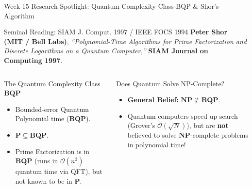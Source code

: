 \documentclass[aspectratio=169,10pt]{beamer}
\begin{document}
\begin{frame}{Week 15 Research Spotlight: Quantum Complexity Class BQP \& Shor's Algorithm}
    \begin{exampleblock}{Seminal Reading: SIAM J. Comput. 1997 / IEEE FOCS 1994}
        \textbf{Peter Shor (MIT / Bell Labs)}, \textit{``Polynomial-Time Algorithms for Prime Factorization and Discrete Logarithms on a Quantum Computer,''} \textbf{SIAM Journal on Computing 1997}.
    \end{exampleblock}
    
    \begin{columns}[T]
        \begin{block}{The Quantum Complexity Class $\mathbf{BQP}$}
            \begin{itemize}
                \item Bounded-error Quantum Polynomial time ($\mathbf{BQP}$).
                \item $\mathbf{P} \subseteq \mathbf{BQP}$.
                \item Prime Factorization is in $\mathbf{BQP}$ (runs in $\mathcal{O}(n^3)$ quantum time via QFT), but not known to be in $\mathbf{P}$.
            \end{itemize}
        \end{block}
        
        \begin{alertblock}{Does Quantum Solve NP-Complete?}
            \begin{itemize}
                \item \textbf{General Belief:} $\mathbf{NP} \not\subseteq \mathbf{BQP}$.
                \item Quantum computers speed up search (Grover's $\mathcal{O}(\sqrt{N})$), but are \textbf{not} believed to solve $\mathbf{NP}$-complete problems in polynomial time!
            \end{itemize}
        \end{alertblock}
    \end{columns}
\end{frame}
\end{document}
